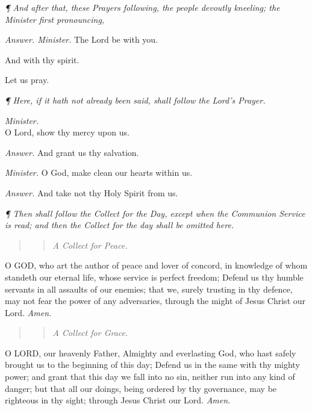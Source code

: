 \emph{¶
And after that, these Prayers following, the people devoutly kneeling;
the Minister first pronouncing,}

\emph{Answer. Minister.} The
Lord be with you.

And with thy spirit. 

Let us pray.

\emph{¶
Here, if it hath not already been said, shall follow the Lord's Prayer.}

\emph{Minister.}\\
O Lord,
show thy mercy upon us.

\emph{Answer.} And grant us thy
salvation.

\emph{Minister.} O God, make clean
our hearts within us.

\emph{Answer.} And take not thy
Holy Spirit from us.

\emph{¶
Then shall follow the Collect for the Day, except when the Communion Service is read; and then the Collect for the
day shall be omitted here.}

\begin{quote}

\begin{quote}

\emph{A
Collect for Peace.}

\end{quote}

\end{quote}

O
GOD, who art the author of peace and lover of concord, in knowledge of
whom standeth our eternal life, whose service is perfect freedom; Defend
us thy humble servants in all assaults of our enemies; that we, surely
trusting in thy defence, may not fear the power of any adversaries, through
the might of Jesus Christ our Lord. \emph{Amen.}

\begin{quote}

\begin{quote}

\emph{A
Collect for Grace.}

\end{quote}

\end{quote}

O
LORD, our heavenly Father, Almighty and everlasting God, who hast safely
brought us to the beginning of this day; Defend us in the same with thy
mighty power; and grant that this day we fall into no sin, neither run
into any kind of danger; but that all our doings, being ordered by thy
governance, may be righteous in thy sight; through Jesus Christ our Lord.
\emph{Amen}.

